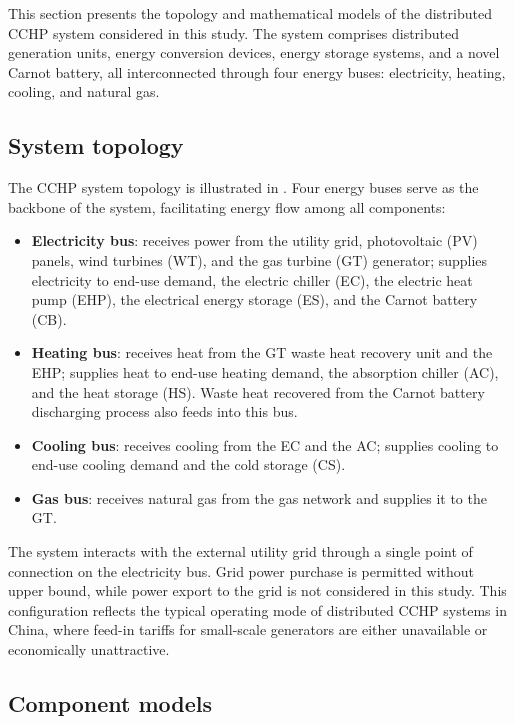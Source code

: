 This section presents the topology and mathematical models of the distributed CCHP system considered in this study. The system comprises distributed generation units, energy conversion devices, energy storage systems, and a novel Carnot battery, all interconnected through four energy buses: electricity, heating, cooling, and natural gas.

\subsection{System topology}
\label{sec:topology}

The CCHP system topology is illustrated in . Four energy buses serve as the backbone of the system, facilitating energy flow among all components:

\begin{itemize}
    \item \textbf{Electricity bus}: receives power from the utility grid, photovoltaic (PV) panels, wind turbines (WT), and the gas turbine (GT) generator; supplies electricity to end-use demand, the electric chiller (EC), the electric heat pump (EHP), the electrical energy storage (ES), and the Carnot battery (CB).
    \item \textbf{Heating bus}: receives heat from the GT waste heat recovery unit and the EHP; supplies heat to end-use heating demand, the absorption chiller (AC), and the heat storage (HS). Waste heat recovered from the Carnot battery discharging process also feeds into this bus.
    \item \textbf{Cooling bus}: receives cooling from the EC and the AC; supplies cooling to end-use cooling demand and the cold storage (CS).
    \item \textbf{Gas bus}: receives natural gas from the gas network and supplies it to the GT.
\end{itemize}

The system interacts with the external utility grid through a single point of connection on the electricity bus. Grid power purchase is permitted without upper bound, while power export to the grid is not considered in this study. This configuration reflects the typical operating mode of distributed CCHP systems in China, where feed-in tariffs for small-scale generators are either unavailable or economically unattractive.

\subsection{Component models}
\label{sec:components}


